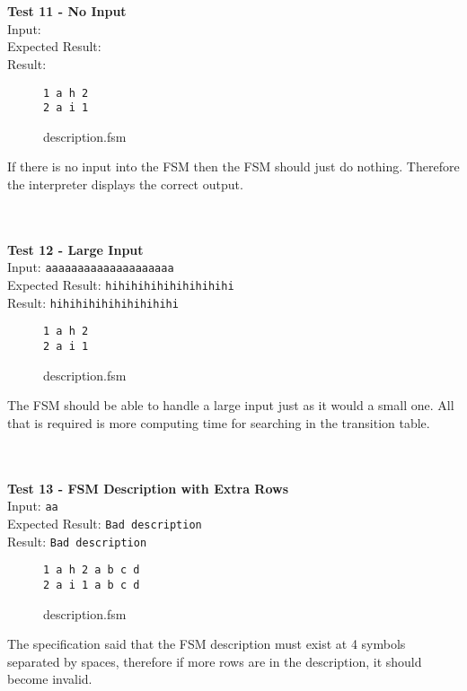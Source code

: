 \documentclass{article}
\begin{document}
\noindent \\ \\ \textbf{Test 11 - No Input} \\
\noindent Input: \verb++ \\
Expected Result: \verb++ \\
Result: \verb++ \\
\begin{figure}[H]
\center
\begin{BVerbatim}
1 a h 2
2 a i 1
\end{BVerbatim}
\caption{description.fsm}
\end{figure}
\noindent If there is no input into the FSM then the FSM should just do nothing. Therefore the interpreter displays the correct output.

\noindent \\ \\ \textbf{Test 12 - Large Input} \\
\noindent Input: \verb+aaaaaaaaaaaaaaaaaaaa+ \\
Expected Result: \verb+hihihihihihihihihihi+ \\
Result: \verb+hihihihihihihihihihi+ \\
\begin{figure}[H]
\center
\begin{BVerbatim}
1 a h 2
2 a i 1
\end{BVerbatim}
\caption{description.fsm}
\end{figure}
\noindent The FSM should be able to handle a large input just as it would a small one. All that is required is more computing time for searching in the transition table.

\noindent \\ \\ \textbf{Test 13 - FSM Description with Extra Rows} \\
\noindent Input: \verb+aa+ \\
Expected Result: \verb+Bad description+ \\
Result: \verb+Bad description+ \\
\begin{figure}[H]
\center
\begin{BVerbatim}
1 a h 2 a b c d
2 a i 1 a b c d
\end{BVerbatim}
\caption{description.fsm}
\end{figure}
\noindent The specification said that the FSM description must exist at 4 symbols separated by spaces, therefore if more rows are in the description, it should become invalid.
\end{document}
